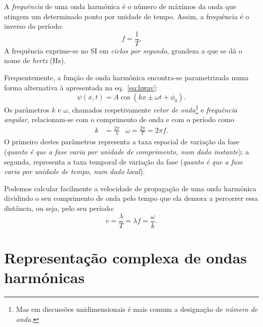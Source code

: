 A \emph{frequência} de uma onda harmónica é o número de máximos da onda que
atingem um determinado ponto por unidade de tempo. Assim, a frequência é o
inverso do período:
\begin{equation*}
    f=\frac{1}{T}.
\end{equation*}
A frequência exprime-se no SI em \emph{ciclos por segundo,} grandeza a que se dá
o nome de \emph{hertz} (Hz).

Frequentemente, a função de onda harmónica encontra-se parametrizada numa forma
alternativa à apresentada na eq.~\eqref{eq:hwav}:
\begin{equation*}
  \psi(x,t)=A\cos\left(kx\pm\omega t+\phi_0\right).
\end{equation*}
Os parâmetros $k$ e $\omega$, chamados respetivamente \emph{vetor de
onda}\footnote{Mas em discussões unidimensionais é mais comum a designação de
\emph{número de onda.}} e \emph{frequência angular,} relacionam\-\mbox{-se} com o
comprimento de onda e com o período como
\begin{align*}
  k&=\frac{2\pi}{\lambda}&\omega=\frac{2\pi}{T}=2\pi f.
\end{align*}
O primeiro destes parâmetros representa a taxa espacial de variação da fase
(\emph{quanto é que a fase varia por unidade de comprimento, num dado instante});
a segunda, representa a taxa temporal de variação da fase (\emph{quanto é que a
fase varia por unidade de tempo, num dado local}).

Podemos calcular facilmente a velocidade de propagação de uma onda harmónica
dividindo o seu comprimento de onda pelo tempo que ela demora a percorrer essa
distância, ou seja, pelo seu período:
\begin{equation*}
  v=\frac{\lambda}{T} = \lambda f=\frac{\omega}{k}.
\end{equation*}

\section{Representação complexa de ondas harmónicas}
